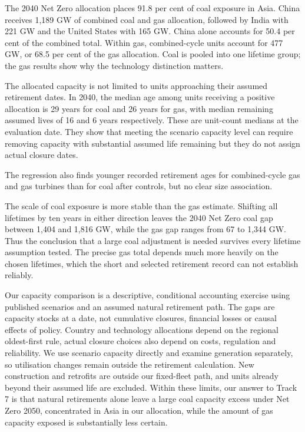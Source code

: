 \documentclass[11pt,a4paper]{article}
\begin{document}
The 2040 Net Zero allocation places 91.8 per cent of coal exposure in Asia. China receives 1,189 GW of combined coal and gas allocation, followed by India with 221 GW and the United States with 165 GW. China alone accounts for 50.4 per cent of the combined total. Within gas, combined-cycle units account for 477 GW, or 68.5 per cent of the gas allocation. Coal is pooled into one lifetime group; the gas results show why the technology distinction matters.

The allocated capacity is not limited to units approaching their assumed retirement dates. In 2040, the median age among units receiving a positive allocation is 29 years for coal and 26 years for gas, with median remaining assumed lives of 16 and 6 years respectively. These are unit-count medians at the evaluation date. They show that meeting the scenario capacity level can require removing capacity with substantial assumed life remaining but they do not assign actual closure dates.

The regression also finds younger recorded retirement ages for combined-cycle gas and gas turbines than for coal after controls, but no clear size association.

The scale of coal exposure is more stable than the gas estimate. Shifting all lifetimes by ten years in either direction leaves the 2040 Net Zero coal gap between 1,404 and 1,816 GW, while the gas gap ranges from 67 to 1,344 GW. Thus the conclusion that a large coal adjustment is needed survives every lifetime assumption tested. The precise gas total depends much more heavily on the chosen lifetimes, which the short and selected retirement record can not establish reliably.

Our capacity comparison is a descriptive, conditional accounting exercise using published scenarios and an assumed natural retirement path. The gaps are capacity stocks at a date, not cumulative closures, financial losses or causal effects of policy. Country and technology allocations depend on the regional oldest-first rule, actual closure choices also depend on costs, regulation and reliability. We use scenario capacity directly and examine generation separately, so utilisation changes remain outside the retirement calculation. New construction and retrofits are outside our fixed-fleet path, and units already beyond their assumed life are excluded. Within these limits, our answer to Track 7 is that natural retirements alone leave a large coal capacity excess under Net Zero 2050, concentrated in Asia in our allocation, while the amount of gas capacity exposed is substantially less certain.
\end{document}
